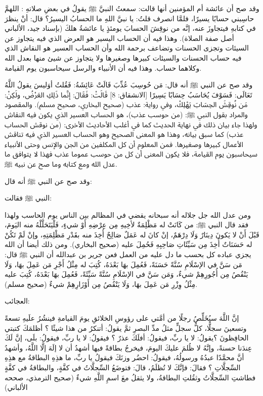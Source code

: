 وقد صح أن عائشة أم المؤمنين أنها قالت: سمعتُ النبيَّ ﷺ يقولُ في بعضِ صلاتهِ : اللهمَّ حاسِبني حسابًا يسيرًا، فلمَّا انصرف قلتُ: يا نبيَّ اللهِ ما الحسابُ اليسيرُ؟ قال: أنْ ينظرَ في كتابهِ فيتجاوزَ عنه، إنَّه من نوقِشَ الحسابَ يومئذٍ يا عائشةُ هلكَ {\footnotesize (بإسناد جيد، الألباني أصل صفة الصلاة)}. وهذا فيه أن الحساب اليسير هو العرض الذي فيه يتجاوز عن السيئات وتجزى الحسنات وتضاعف برحمة الله وأن الحساب العسير هو النقاش الذي فيه حساب الحسنات والسيئات كبيرها وصغيرها ولا يتجاوز عن شيئ منها بعدل الله وكلاهما حساب. وهذا فيه أن الأنبياء والرسل سيحاسبون يوم القيامة. 

وقد صح عن النبي ﷺ أنه قال: مَن حُوسِبَ عُذِّبَ قَالَتْ عَائِشَةُ: فَقُلتُ أوَليسَ يقولُ اللَّهُ تَعَالَى: {فَسَوْفَ يُحَاسَبُ حِسَابًا يَسِيرًا} [الانشقاق: 8] قَالَتْ: فَقَالَ: إنَّما ذَلِكِ العَرْضُ، ولَكِنْ: مَن نُوقِشَ الحِسَابَ يَهْلِكْ، وفي رواية: عذب {\footnotesize (صحيح البخاري، صحيح مسلم)}. والمقصود والمراد بقول النبي ﷺ: (من حوسب عذب)،  هو الحساب العسير الذي يكون فيه النقاش ولهذا جاء بيان ذلك في نهاية الحديث كما في أغلب الأحاديث الأخرى: (من نوقش الحساب عذب) كما سبق بيانه، وهذا هو المعنى الصحيح وهو الحساب العسير الذي فيه تناقش الأعمال كبيرها وصغيرها. فمن المعلوم أن كل المكلفين من الجن والإنس وحتى الأنبياء سيحاسبون يوم القيامة، فلا يكون المعنى أن كل من حوسب عموما عذب فهذا لا يتوافق ما عدل الله ومع كتابه وما صح عن نبيه ﷺ. 

وقد صح عن النبي ﷺ أنه قال: 

النبي ﷺ فقالت: 










ومن عدل الله جل جلاله أنه سبحانه يقضي في المظالم بين الناس يوم الحاسب ولهذا فقد قال النبي ﷺ:  من كَانَتْ له مَظْلِمَةٌ لأخِيهِ مِن عِرْضِهِ أَوْ شيءٍ، فَلْيَتَحَلَّلْهُ منه اليَومَ، قَبْلَ أَنْ لا يَكونَ دِينَارٌ وَلَا دِرْهَمٌ، إنْ كانَ له عَمَلٌ صَالِحٌ أُخِذَ منه بقَدْرِ مَظْلِمَتِهِ، وإنْ لَمْ تَكُنْ له حَسَنَاتٌ أُخِذَ مِن سَيِّئَاتِ صَاحِبِهِ فَحُمِلَ عليه {\footnotesize (صحيح البخاري)}. ومن ذلك أيضا أن الله يجزي عباده كل بحسب ما دل عليه من العمل فعن جرير بن عبدالله أن النبي ﷺ قال: مَن سَنَّ في الإسْلَامِ سُنَّةً حَسَنَةً، فَعُمِلَ بهَا بَعْدَهُ، كُتِبَ له مِثْلُ أَجْرِ مَن عَمِلَ بهَا، وَلَا يَنْقُصُ مِن أُجُورِهِمْ شيءٌ، وَمَن سَنَّ في الإسْلَامِ سُنَّةً سَيِّئَةً، فَعُمِلَ بهَا بَعْدَهُ، كُتِبَ عليه مِثْلُ وِزْرِ مَن عَمِلَ بهَا، وَلَا يَنْقُصُ مِن أَوْزَارِهِمْ شيءٌ {\footnotesize (صحيح مسلم)}.

العجائب: 

إنَّ اللَّهَ سيُخَلِّصُ رجلًا من أمَّتي على رؤوسِ الخلائقِ يومَ القيامةِ فينشُرُ علَيهِ تسعةً وتسعينَ سجلًّا، كلُّ سجلٍّ مثلُ مدِّ البصرِ ثمَّ يقولُ: أتنكرُ من هذا شيئًا ؟ أظلمَكَ كتبتي الحافِظونَ ؟يقولُ: لا يا ربِّ، فيقولُ: أفلَكَ عذرٌ ؟ فيقولُ: لا يا ربِّ، فيقولُ: بلَى، إنَّ لَكَ عِندَنا حسنةً، وإنَّهُ لا ظُلمَ عليكَ اليومَ، فيخرجُ بطاقةً فيها أشهدُ أن لا إلَهَ إلَّا اللَّهُ، وأشهدُ أنَّ محمَّدًا عبدُهُ ورسولُهُ، فيقولُ: احضُر وزنَكَ فيقولُ يا ربِّ، ما هذِهِ البطاقةُ مع هذِهِ السِّجلَّاتِ ؟ فقالَ: فإنَّكَ لا تُظلَمُ، قالَ: فتوضَعُ السِّجلَّاتُ في كفَّةٍ، والبطاقةُ في كفَّةٍ فطاشتِ السِّجلَّاتُ وثقُلتِ البطاقةُ، ولا يثقلُ معَ اسمِ اللَّهِ شيءٌ {\footnotesize (صحيح الترمذي، صححه الألباني)}


